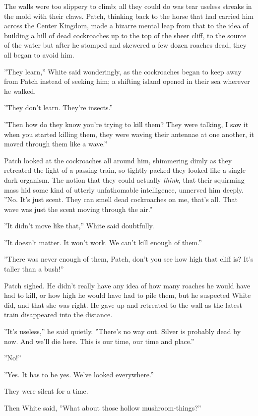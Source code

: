 \documentclass[12pt]{book}
\begin{document}
The walls were too slippery to climb; all they could do was tear useless streaks in the mold with their claws. Patch, thinking back to the horse that had carried him across the Center Kingdom, made a bizarre mental leap from that to the idea of building a hill of dead cockroaches up to the top of the sheer cliff, to the source of the water %
but after he stomped and skewered a few dozen roaches dead, they all began to avoid him.

''They learn,'' White said wonderingly, as the cockroaches began to keep away from Patch instead of seeking him; a shifting island opened in their sea wherever he walked.

''They don't learn. They're insects.''

''Then how do they know you're trying to kill them? They were talking, I saw it when you started killing them, they were waving their antennae at one another, it moved through them like a wave.''

Patch looked at the cockroaches all around him, shimmering dimly as they retreated the light of a passing train, so tightly packed they looked like a single dark organism. The notion that they could actually {\it think,} that their squirming mass hid some kind of utterly unfathomable intelligence, unnerved him deeply. ''No. It's just scent. They can smell dead cockroaches on me, that's all. That wave was just the scent moving through the air.''

''It didn't move like that,'' White said doubtfully.

''It doesn't matter. It won't work. We can't kill enough of them.''

''There was never enough of them, Patch, don't you see how high that cliff is? It's taller than a bush!''

Patch sighed. He didn't really have any idea of how many roaches he would have had to kill, or how high he would have had to pile them, but he suspected White did, and that she was right. He gave up and retreated to the wall as the latest train disappeared into the distance.

''It's useless,'' he said quietly. ''There's no way out. Silver is probably dead by now. And we'll die here. This is our time, our time and place.''

''No!''

''Yes. It has to be yes. We've looked everywhere.''

They were silent for a time.

Then White said, ''What about those hollow mushroom-things?''
\end{document}
